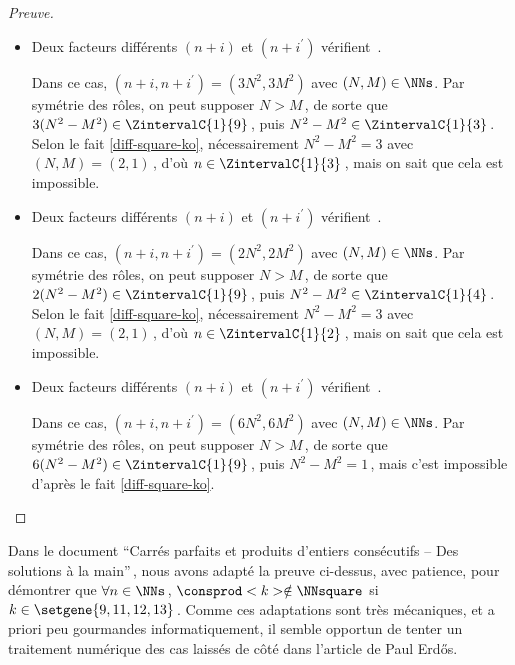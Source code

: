 \begin{proof}[Preuve]
\begin{itemize}
    	\medskip
		\item Deux facteurs différents $(n+i)$ et $(n+i^\prime)$ vérifient \,.
		
		\smallskip
		\noindent
		Dans ce cas, $(n+i, n+i^\prime) = (3 N^2, 3 M^2)$ avec $(N, M) \in \NNs$.
		Par symétrie des rôles, on peut supposer $N > M$\,, de sorte que $3(N^2 - M^2) \in \ZintervalC{1}{9}$\,, puis $N^2 - M^2 \in \ZintervalC{1}{3}$\,. 
		Selon le fait \ref{diff-square-ko}, nécessairement $N^2 - M^2 = 3$ avec $(N, M) = (2, 1)$\,, d'où $n \in \ZintervalC{1}{3}$\,, mais on sait que cela est impossible.


    	\medskip
		\item Deux facteurs différents $(n+i)$ et $(n+i^\prime)$ vérifient \,.
		
		\smallskip
		\noindent
		Dans ce cas, $(n+i, n+i^\prime) = (2 N^2, 2 M^2)$ avec $(N, M) \in \NNs$.
		Par symétrie des rôles, on peut supposer $N > M$\,, de sorte que $2(N^2 - M^2) \in \ZintervalC{1}{9}$\,, puis $N^2 - M^2 \in \ZintervalC{1}{4}$\,. 
		Selon le fait \ref{diff-square-ko}, nécessairement $N^2 - M^2 = 3$ avec $(N, M) = (2, 1)$\,, d'où $n \in \ZintervalC{1}{2}$\,, mais on sait que cela est impossible.


    	\medskip
		\item Deux facteurs différents $(n+i)$ et $(n+i^\prime)$ vérifient \,.
		
		\smallskip
		\noindent
		Dans ce cas, $(n+i, n+i^\prime) = (6 N^2, 6 M^2)$ avec $(N, M) \in \NNs$.
		Par symétrie des rôles, on peut supposer $N > M$\,, de sorte que $6(N^2 - M^2) \in \ZintervalC{1}{9}$\,, puis $N^2 - M^2 = 1$\,, mais c'est impossible d'après le fait \ref{diff-square-ko}.
		\qedhere
    \end{itemize}
\end{proof}




Dans le document \enquote{Carrés parfaits et produits d'entiers consécutifs -- Des solutions à la main}\,, nous avons adapté la preuve ci-dessus, avec patience, pour démontrer que $\forall n \in \NNs$\,, $\consprod<k> \notin \NNsquare$ si $k \in \setgene{9, 11, 12, 13}$\,.
Comme ces adaptations sont très mécaniques, et a priori peu gourmandes informatiquement, il semble opportun de tenter un traitement numérique des cas laissés de côté dans l'article de Paul Erdős. 

